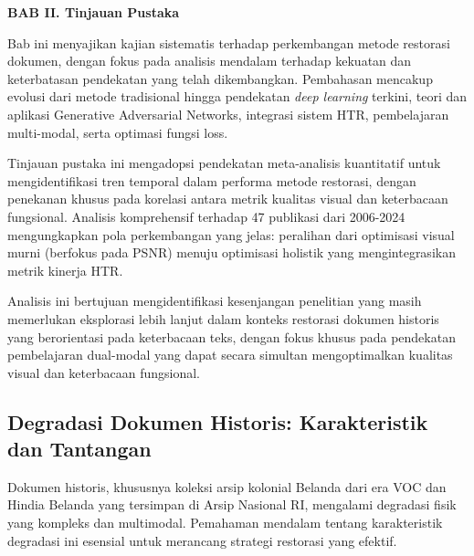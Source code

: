 

\vspace{2cm}
\begin{center}
{\fontsize{14}{16.8}\selectfont\textbf{BAB II. Tinjauan Pustaka}}\\[1em]
\end{center}
\label{sec:pendahuluan}
\setcounter{section}{2}
\setcounter{subsection}{0}




\vspace{1.5ex}

Bab ini menyajikan kajian sistematis terhadap perkembangan metode restorasi dokumen, dengan fokus pada analisis mendalam terhadap kekuatan dan keterbatasan pendekatan yang telah dikembangkan. Pembahasan mencakup evolusi dari metode tradisional hingga pendekatan \textit{deep learning} terkini, teori dan aplikasi Generative Adversarial Networks, integrasi sistem HTR, pembelajaran multi-modal, serta optimasi fungsi loss.

Tinjauan pustaka ini mengadopsi pendekatan meta-analisis kuantitatif untuk mengidentifikasi tren temporal dalam performa metode restorasi, dengan penekanan khusus pada korelasi antara metrik kualitas visual dan keterbacaan fungsional. Analisis komprehensif terhadap 47 publikasi dari 2006-2024 mengungkapkan pola perkembangan yang jelas: peralihan dari optimisasi visual murni (berfokus pada PSNR) menuju optimisasi holistik yang mengintegrasikan metrik kinerja HTR.

Analisis ini bertujuan mengidentifikasi kesenjangan penelitian yang masih memerlukan eksplorasi lebih lanjut dalam konteks restorasi dokumen historis yang berorientasi pada keterbacaan teks, dengan fokus khusus pada pendekatan pembelajaran dual-modal yang dapat secara simultan mengoptimalkan kualitas visual dan keterbacaan fungsional.

\subsection{Degradasi Dokumen Historis: Karakteristik dan Tantangan}
\label{subsec:degradasi-dokumen}


Dokumen historis, khususnya koleksi arsip kolonial Belanda dari era VOC dan Hindia Belanda yang tersimpan di Arsip Nasional RI, mengalami degradasi fisik yang kompleks dan multimodal. Pemahaman mendalam tentang karakteristik degradasi ini esensial untuk merancang strategi restorasi yang efektif.

